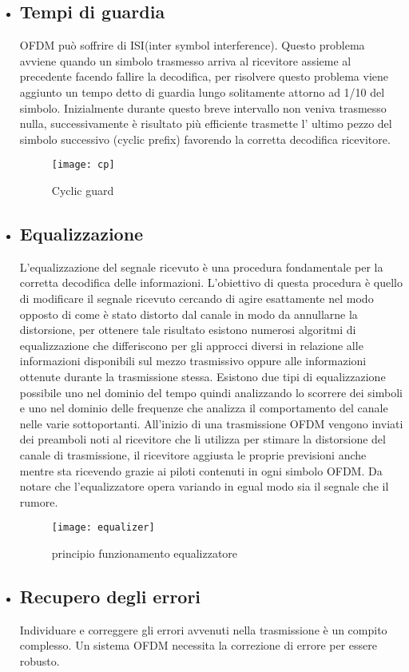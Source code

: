 \begin{itemize}
 	 \item \subsection{Tempi di guardia } OFDM può soffrire di ISI(inter symbol interference). Questo problema avviene quando un simbolo trasmesso arriva al ricevitore assieme al precedente facendo fallire la decodifica, per risolvere questo problema viene aggiunto un tempo detto di guardia lungo solitamente attorno ad 1/10 del simbolo. Inizialmente durante questo breve intervallo non veniva trasmesso nulla, successivamente è risultato più efficiente trasmette l' ultimo pezzo del simbolo successivo (cyclic prefix) favorendo la corretta decodifica  ricevitore.
 	 \begin{figure}[h]
 	 	\centering
 	 	\texttt{[image: cp]}
 	 	\caption{Cyclic guard \cite{cp}}\label{fig:1}
 	 \end{figure}
     \item \subsection{Equalizzazione} L'equalizzazione del segnale ricevuto è una procedura fondamentale per la corretta decodifica delle informazioni. L'obiettivo di questa procedura è quello di modificare il segnale ricevuto cercando di agire esattamente nel modo opposto di come è stato distorto dal canale in modo da annullarne la distorsione, per ottenere tale risultato esistono numerosi algoritmi di equalizzazione che differiscono per gli approcci diversi in relazione alle informazioni disponibili sul mezzo trasmissivo oppure alle informazioni ottenute durante la trasmissione stessa. Esistono due tipi di equalizzazione possibile uno nel dominio del tempo quindi analizzando lo scorrere dei simboli e uno nel dominio delle frequenze che analizza il comportamento del canale nelle varie sottoportanti. All'inizio di una trasmissione OFDM vengono inviati dei preamboli noti al ricevitore che li utilizza per stimare la distorsione del canale di trasmissione, il ricevitore aggiusta le proprie previsioni anche mentre sta ricevendo grazie ai piloti contenuti in ogni simbolo OFDM. Da notare che l'equalizzatore opera variando in egual modo sia il segnale che il rumore.
     \begin{figure}[h]
     	\centering
     	\texttt{[image: equalizer]}
     	\caption{principio funzionamento equalizzatore \cite{equalizer}}\label{fig:1}
     \end{figure}
 \item \subsection{Recupero degli errori} Individuare e correggere gli errori avvenuti nella trasmissione è un compito complesso. Un sistema OFDM necessita la correzione di errore per essere robusto.

\end{itemize}
